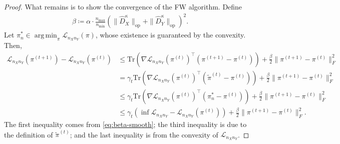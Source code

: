 \documentclass{article}
\DeclareMathOperator*{\argmin}{arg\,min}
\begin{document}
\begin{proof}
	What remains is to show the convergence of the FW algorithm. Define
	\begin{align*}
		\beta \coloneqq \alpha \cdot \frac{n_{\max}}{n_{\min}} \left(\|\hat{D}_X^\kappa\|_{\mathrm{op}} + \|\hat{D}_Y^\kappa\|_{\mathrm{op}}\right)^2 .
	\end{align*}
	Let $\pi_n^\ast \in \argmin_{\pi} \mathcal{L}_{n_Xn_Y}(\pi)$, whose existence is guaranteed by the convexity. Then,
	\begin{align*}
		\mathcal{L}_{n_Xn_Y}(\pi^{(t+1)}) - \mathcal{L}_{n_Xn_Y}(\pi^{(t)}) &\leq \mathrm{Tr}\left(\nabla \mathcal{L}_{n_Xn_Y}(\pi^{(t)})^\top (\pi^{(t+1)} - \pi^{(t)})\right) + \frac{\beta}{2} \|\pi^{(t+1)} - \pi^{(t)} \|_F^2 \\
		&= \gamma_t\mathrm{Tr}\left(\nabla \mathcal{L}_{n_Xn_Y}(\pi^{(t)})^\top (\tilde{\pi}^{(t)} - \pi^{(t)})\right) + \frac{\beta}{2} \|\pi^{(t+1)} - \pi^{(t)} \|_F^2 \\
		&\leq \gamma_t \mathrm{Tr}\left(\nabla \mathcal{L}_{n_Xn_Y}(\pi^{(t)})^\top (\pi_n^\ast - \pi^{(t)})\right) + \frac{\beta}{2} \|\pi^{(t+1)} - \pi^{(t)} \|_F^2 \\
		&\leq \gamma_t \left(\inf\mathcal{L}_{n_Xn_Y} - \mathcal{L}_{n_Xn_Y}(\pi^{(t)})\right) + \frac{\beta}{2} \|\pi^{(t+1)} - \pi^{(t)} \|_F^2 .
	\end{align*}
	The first inequality comes from \eqref{eq:beta-smooth}; the third inequality is due to the definition of $\tilde{\pi}^{(t)}$; and the last inequality is from the convexity of $\mathcal{L}_{n_Xn_Y}$. 
	

\end{proof}
\end{document}
